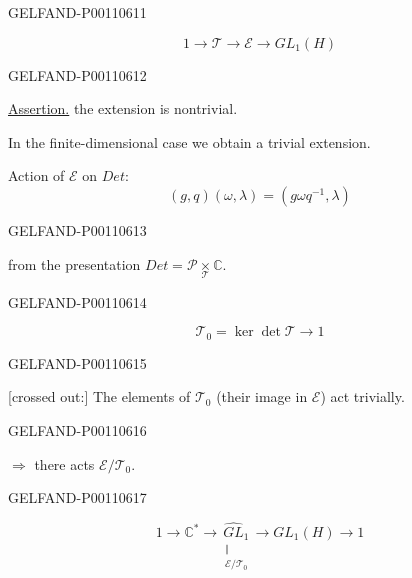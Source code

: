 \begin{GelfandAdjacentEvidence}{GELFAND-P001106}{11}

\[
1\longrightarrow\mathcal T\longrightarrow\mathcal E\longrightarrow GL_1(H)
\]
\end{GelfandAdjacentEvidence}
\begin{GelfandAdjacentEvidence}{GELFAND-P001106}{12}


\underline{Assertion.} the extension is nontrivial.

In the finite-dimensional case we obtain a trivial extension.

Action of $\mathcal E$ on $Det$:
\[
(g,q)(\omega,\lambda)=(g\omega q^{-1},\lambda)
\]
\end{GelfandAdjacentEvidence}
\begin{GelfandAdjacentEvidence}{GELFAND-P001106}{13}

from the presentation $Det=\mathcal P\underset{\mathcal T}{\times}\mathbb C$.
\end{GelfandAdjacentEvidence}
\begin{GelfandAdjacentEvidence}{GELFAND-P001106}{14}


\[
\mathcal T_0=\ker\det\mathcal T\longrightarrow1
\]
\end{GelfandAdjacentEvidence}
\begin{GelfandAdjacentEvidence}{GELFAND-P001106}{15}


[crossed out:] The elements of $\mathcal T_0$ (their image in $\mathcal E$) act trivially.
\end{GelfandAdjacentEvidence}
\begin{GelfandAdjacentEvidence}{GELFAND-P001106}{16}

$\Rightarrow$ there acts $\mathcal E/\mathcal T_0$.
\end{GelfandAdjacentEvidence}
\begin{GelfandAdjacentEvidence}{GELFAND-P001106}{17}


\[
1\longrightarrow\mathbb C^*\longrightarrow
\underset{\substack{\Vert\\\mathcal E/\mathcal T_0}}{\widehat{GL}_1}
\longrightarrow GL_1(H)\longrightarrow 1
\]
\end{GelfandAdjacentEvidence}
